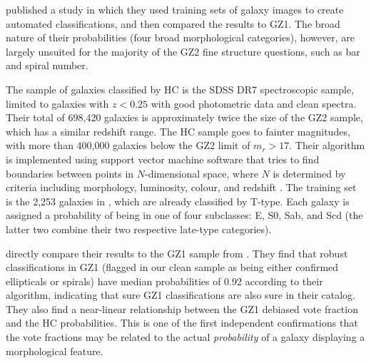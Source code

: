\documentclass[useAMS,usenatbib]{mn2e}
\begin{document}
\citet[][HC]{hue11} published a study in which they used training sets of galaxy images to create automated classifications, and then compared the results to GZ1. The broad nature of their probabilities (four broad morphological categories), however, are largely unsuited for the majority of the GZ2 fine structure questions, such as bar and spiral number. 

The sample of galaxies classified by HC is the SDSS DR7 spectroscopic sample, limited to galaxies with $z<0.25$ with good photometric data and clean spectra. Their total of 698,420 galaxies is approximately twice the size of the GZ2 sample, which has a similar redshift range. The HC sample goes to fainter magnitudes, with more than 400,000 galaxies below the GZ2 limit of $m_r>17$. Their algorithm is implemented using support vector machine software that tries to find boundaries between points in $N$-dimensional space, where $N$ is determined by criteria including morphology, luminosity, colour, and redshift \citep{hue08}. The training set is the 2,253 galaxies in \citet{fuk07}, which are already classified by T-type. Each galaxy is assigned a probability of being in one of four subclasses: E, S0, Sab, and Scd (the latter two combine their two respective late-type categories). 


\citet{hue11} directly compare their results to the GZ1 sample from \citet{lin11}. They find that robust classifications in GZ1 (flagged in our clean sample as being either confirmed ellipticals or spirals) have median probabilities of 0.92 according to their algorithm, indicating that sure GZ1 classifications are also sure in their catalog. They also find a near-linear relationship between the GZ1 debiased vote fraction and the HC probabilities. This is one of the first independent confirmations that the vote fractions may be related to the actual {\em probability} of a galaxy displaying a morphological feature. 

\end{document}
